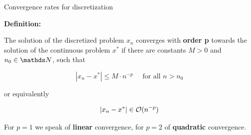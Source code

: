 \begin{vbframe}{Convergence rates for discretization}

\textbf{Definition: }

The solution of the discretized problem $x_n$ converges with \textbf{order p} towards the solution of the continuous problem $x^*$ if there are constants $M > 0$ and $n_0 \in \N$, such that

$$
|x_n - x^*| \le M\cdot n^{-p} \quad \text{ for all } n > n_0
$$

or equivalently

$$
|x_n - x^*| \in \mathcal{O}{(n^{-p})}
$$

For $p = 1$ we speak of \textbf{linear} convergence, for $p = 2$ of \textbf{quadratic} convergence.

\end{vbframe}


% 
% 
% 



%
%
%
%
%
%
%
%



